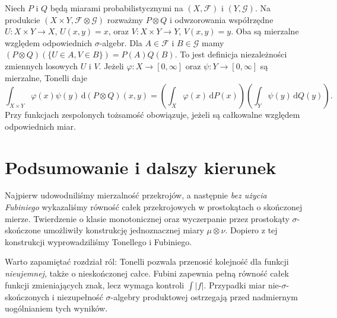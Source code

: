 \begin{przyklad}
Niech $P$ i $Q$ będą miarami probabilistycznymi
na $(X,\mathcal F)$ i $(Y,\mathcal G)$.
Na produkcie $(X\times Y,\mathcal F\otimes\mathcal G)$
rozważmy $P\otimes Q$ i odwzorowania współrzędne
$U:X\times Y\to X$, $U(x,y)=x$, oraz
$V:X\times Y\to Y$, $V(x,y)=y$.
Oba są mierzalne względem odpowiednich $\sigma$-algebr.
Dla $A\in\mathcal F$ i $B\in\mathcal G$
mamy
$(P\otimes Q)(\{U\in A,V\in B\})=P(A)Q(B)$.
To jest definicja niezależności zmiennych losowych
$U$ i $V$. Jeżeli $\varphi:X\to[0,\infty]$ oraz
$\psi:Y\to[0,\infty]$ są mierzalne, Tonelli daje
\[
\int_{X\times Y}\varphi(x)\psi(y)
\,\mathrm d(P\otimes Q)(x,y)
=\left(\int_X\varphi(x)\,\mathrm dP(x)\right)
\left(\int_Y\psi(y)\,\mathrm dQ(y)\right).
\]
Przy funkcjach zespolonych tożsamość obowiązuje,
jeżeli są całkowalne względem odpowiednich miar.
\end{przyklad}

\section{Podsumowanie i dalszy kierunek}
Najpierw udowodniliśmy mierzalność przekrojów,
a następnie \emph{bez użycia Fubiniego} wykazaliśmy
równość całek przekrojowych w prostokątach o
skończonej mierze. Twierdzenie o klasie monotonicznej
oraz wyczerpanie przez prostokąty $\sigma$-skończone
umożliwiły konstrukcję jednoznacznej miary
$\mu\otimes\nu$. Dopiero z tej konstrukcji
wyprowadziliśmy Tonellego i Fubiniego.

Warto zapamiętać rozdział ról: Tonelli pozwala
przenosić kolejność dla funkcji \emph{nieujemnej},
także o nieskończonej całce. Fubini zapewnia
pełną równość całek funkcji zmieniających znak,
lecz wymaga kontroli $\int|f|$. Przypadki
miar nie-$\sigma$-skończonych i niezupełność
$\sigma$-algebry produktowej ostrzegają przed
nadmiernym uogólnianiem tych wyników.
